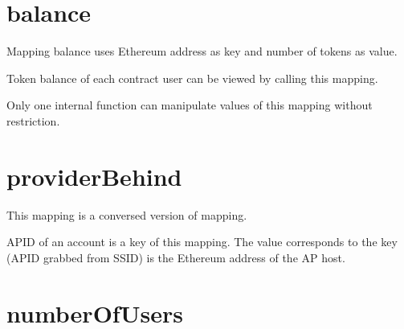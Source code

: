 \documentclass[letterpaper,10pt,english]{sphinxmanual}
\begin{document}
\section{balance}
\label{\detokenize{index:balance}}
%
\begin{sphinxVerbatim}[commandchars=\\\{\}]
     
\end{sphinxVerbatim}

Mapping balance uses Ethereum address as key and number of tokens as value.

Token balance of each contract user can be viewed by calling this mapping.

Only one internal function {\hyperref[\detokenize{index:id1}]{}} can manipulate values of this mapping without restriction.


\section{providerBehind}
\label{\detokenize{index:providerbehind}}
%
\begin{sphinxVerbatim}[commandchars=\\\{\}]
     
\end{sphinxVerbatim}

This mapping is a conversed version of {\hyperref[\detokenize{index:apid}]{}} mapping.

APID of an account is a key of this mapping.
The value corresponds to the key (APID grabbed from SSID)
is the Ethereum address of the AP host.


\section{numberOfUsers}
\label{\detokenize{index:numberofusers}}
%
\begin{sphinxVerbatim}[commandchars=\\\{\}]
     
\end{sphinxVerbatim}
\end{document}
